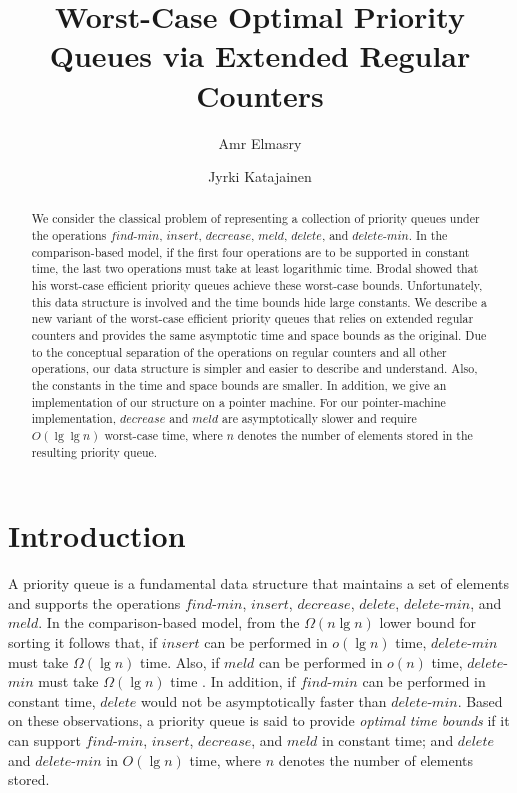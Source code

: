 \documentclass{llncs}
\newcommand{\Findmin}{\mbox{$\mathit{find}$\mbox{\rm -}$\mathit{min}$}}
\newcommand{\Insert}{\mbox{$\mathit{insert}$}}
\newcommand{\Deletemin}{\mbox{$\mathit{delete}$\mbox{\rm -}$\mathit{min}$}}
\newcommand{\Decrease}{\mbox{$\mathit{decrease}$}}
\newcommand{\Delete}{\mbox{$\mathit{delete}$}}
\newcommand{\Meld}{\mbox{$\mathit{meld}$}}
\begin{document}
\title{Worst-Case Optimal Priority Queues via Extended Regular Counters}

\author{Amr Elmasry \and Jyrki Katajainen}


\date{}
\maketitle 
\pagestyle{plain}

\begin{abstract}
We consider the classical problem of representing a collection of
priority queues under the operations \Findmin{}, \Insert{},
\Decrease{}, \Meld{}, \Delete{}, and \Deletemin{}.  In the
comparison-based model, if the first four operations are to be
supported in constant time, the last two operations must
take at least logarithmic time. Brodal showed that his
worst-case efficient priority queues achieve these worst-case bounds.
Unfortunately, this data structure is involved and the time bounds hide large
constants. We describe a new variant of the worst-case efficient priority 
queues that relies on extended regular counters and provides the same 
asymptotic time and space bounds as the original. Due to the conceptual 
separation of the operations on regular counters and all other operations, 
our data structure is simpler and easier to describe and understand. 
Also, the constants in the time and space bounds are smaller.
In addition, we give an implementation of our structure on a pointer machine.  
For our pointer-machine implementation, \Decrease{} and \Meld{} are asymptotically 
slower and require $O(\lg\lg{n})$ worst-case time, where $n$ denotes the number 
of elements stored in the resulting priority queue.
\end{abstract}

\section{Introduction}

A priority queue is a fundamental data structure that maintains a set of elements
and supports the operations \Findmin{}, \Insert{}, \Decrease{}, \Delete{}, 
\Deletemin{}, and \Meld{}.  
In the comparison-based model, from the $\Omega(n \lg n)$ lower bound for
sorting it follows that, if \Insert{} can be performed in $o(\lg n)$
time, \Deletemin{} must take $\Omega(\lg n)$ time. Also, if \Meld{}
can be performed in $o(n)$ time, \Deletemin{} must take $\Omega(\lg
n)$ time \cite{Bro95}.  In addition, if \Findmin{} can be performed in
constant time, \Delete{} would not be asymptotically faster than
\Deletemin{}.  Based on these observations, a priority queue is said
to provide \emph{optimal time bounds} if it can support \Findmin{},
\Insert{}, \Decrease{}, and \Meld{} in constant time; and \Delete{} and 
\Deletemin{} in $O(\lg n)$ time, where $n$ denotes the number of elements stored.
\end{document}

